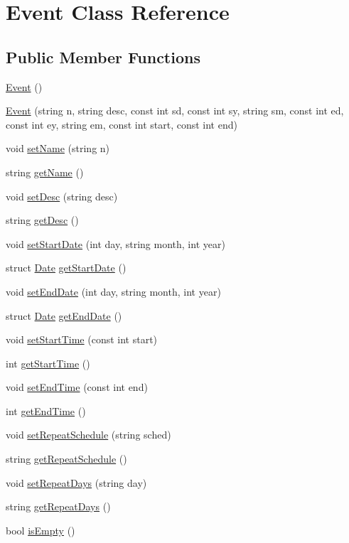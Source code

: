 \hypertarget{class_event}{}\section{Event Class Reference}
\label{class_event}
\subsection*{Public Member Functions}
\begin{DoxyCompactItemize}
\item 
\hyperlink{class_event_a5a40dd4708297f7031e29b39e039ae10}{Event} ()
\item 
\hyperlink{class_event_a088c99ca9fead1b2cff15db869c56a7a}{Event} (string n, string desc, const int sd, const int sy, string sm, const int ed, const int ey, string em, const int start, const int end)
\item 
void \hyperlink{class_event_a613156e63ec4251293134fcec6a93454}{set\+Name} (string n)
\item 
string \hyperlink{class_event_a6be6a0033ddac703543dc5d1040dd9b8}{get\+Name} ()
\item 
void \hyperlink{class_event_ac3dee16c5287bac33ab0c805089caaa0}{set\+Desc} (string desc)
\item 
string \hyperlink{class_event_a24238fbbc07f1fa22bf3074be50c87f6}{get\+Desc} ()
\item 
void \hyperlink{class_event_a09934ab56dc05cd9f49c1962bd696b73}{set\+Start\+Date} (int day, string month, int year)
\item 
struct \hyperlink{struct_date}{Date} \hyperlink{class_event_a6536d75ba5b4dd9f86674f0fd81c75e1}{get\+Start\+Date} ()
\item 
void \hyperlink{class_event_a0a0628267e9bbb4314f7e9aea5003fe4}{set\+End\+Date} (int day, string month, int year)
\item 
struct \hyperlink{struct_date}{Date} \hyperlink{class_event_adde5f5bc15fc96a14611c1b42afd3e10}{get\+End\+Date} ()
\item 
void \hyperlink{class_event_adc4bf90c98819c1ea15c5a59dcc2e471}{set\+Start\+Time} (const int start)
\item 
int \hyperlink{class_event_a3283554ea0739c5c1916269f1a498bb7}{get\+Start\+Time} ()
\item 
void \hyperlink{class_event_a03cd2f48f92276e528ab6e7eba3d6000}{set\+End\+Time} (const int end)
\item 
int \hyperlink{class_event_a15cc6c49faa82aea991deec2f6230c64}{get\+End\+Time} ()
\item 
void \hyperlink{class_event_a453dbe18702a45d928cc8947023a9007}{set\+Repeat\+Schedule} (string sched)
\item 
string \hyperlink{class_event_a928d1271df4ff097dc7f8ffbe49e9410}{get\+Repeat\+Schedule} ()
\item 
void \hyperlink{class_event_ae8acd6e1fc6c6e7e32b55e8345d4eb5e}{set\+Repeat\+Days} (string day)
\item 
string \hyperlink{class_event_a204b0907d17225fd3394dbc413ef6b25}{get\+Repeat\+Days} ()
\item 
bool \hyperlink{class_event_a690ef00dbb8205ad6807b286f02db956}{is\+Empty} ()
\end{DoxyCompactItemize}


